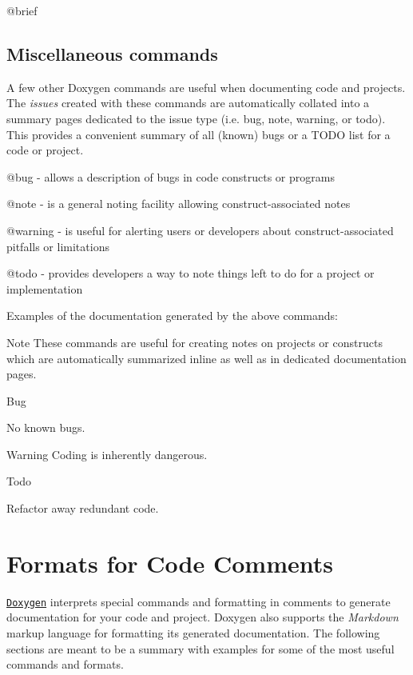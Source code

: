 \begin{DoxyItemize}
\item @brief
\end{DoxyItemize}\hypertarget{xpacc_documentation_guide_misc_com}{}\subsection{Miscellaneous commands}\label{xpacc_documentation_guide_misc_com}
A few other Doxygen commands are useful when documenting code and projects. The {\itshape issues} created with these commands are automatically collated into a summary pages dedicated to the issue type (i.\+e. bug, note, warning, or todo). This provides a convenient summary of all (known) bugs or a T\+O\+DO list for a code or project.
\begin{DoxyItemize}
\item @bug -\/ allows a description of bugs in code constructs or programs
\item @note -\/ is a general noting facility allowing construct-\/associated notes
\item @warning -\/ is useful for alerting users or developers about construct-\/associated pitfalls or limitations
\item @todo -\/ provides developers a way to note things left to do for a project or implementation
\end{DoxyItemize}

Examples of the documentation generated by the above commands\+: \begin{DoxyNote}{Note}
These commands are useful for creating notes on projects or constructs which are automatically summarized inline as well as in dedicated documentation pages. 
\end{DoxyNote}
\begin{DoxyRefDesc}{Bug}
\item[\hyperlink{bug__bug000001}{Bug}]No known bugs. \end{DoxyRefDesc}
\begin{DoxyWarning}{Warning}
Coding is inherently dangerous. 
\end{DoxyWarning}
\begin{DoxyRefDesc}{Todo}
\item[\hyperlink{todo__todo000001}{Todo}]Refactor away redundant code.\end{DoxyRefDesc}
\hypertarget{xpacc_documentation_guide_comment_formats}{}\section{Formats for Code Comments}\label{xpacc_documentation_guide_comment_formats}
\href{http://www.stack.nl/~dimitri/doxygen/}{\tt Doxygen} interprets special commands and formatting in comments to generate documentation for your code and project. Doxygen also supports the {\itshape Markdown} markup language for formatting its generated documentation. The following sections are meant to be a summary with examples for some of the most useful commands and formats.

